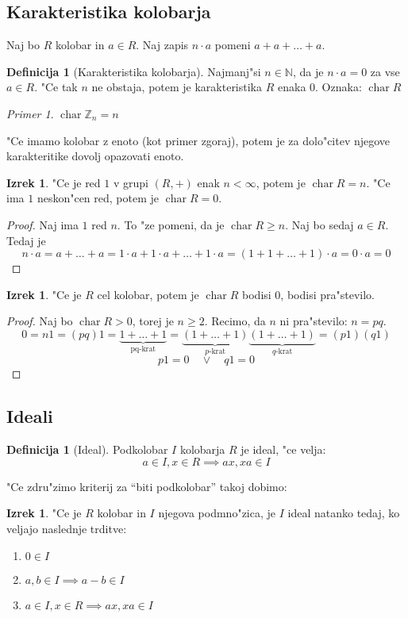 \documentclass[11pt, a4paper]{article}
\theoremstyle{definition}
\newtheorem{defn}[counter]{Definicija}
\newtheorem{theorem}[counter]{Izrek}
\theoremstyle{remark}
\newtheorem*{ex}{Primer}
\newcommand{\N}{\mathbb{N}}
\newcommand{\Z}{\mathbb{Z}}
\newcommand{\ch}{\operatorname{char}}
\begin{document}
	\subsection{Karakteristika kolobarja}
	Naj bo $R$ kolobar in $a \in R$. Naj zapis $n \cdot a$ pomeni $a + a + \ldots + a$.
	\begin{defn}[Karakteristika kolobarja]
		Najmanj"si $n \in \N$, da je $n \cdot a = 0$ za vse $a \in R$. "Ce tak $n$ ne obstaja, potem je karakteristika $R$ enaka $0$.
		Oznaka: $ \ch R$
	\end{defn}

	\begin{ex}
		$ \ch \Z_n = n$
	\end{ex}
	"Ce imamo kolobar z enoto (kot primer zgoraj), potem je za dolo"citev njegove karakteritike dovolj opazovati enoto.
	
	\begin{theorem}
		"Ce je red $1$ v grupi $(R, +)$ enak $n < \infty$, potem je $\ch R = n$. "Ce ima $1$ neskon"cen red, potem je $\ch R = 0$.
	\end{theorem}
	\begin{proof}
		Naj ima $1$ red $n$. To "ze pomeni, da je $\ch R \geq n$.
		Naj bo sedaj $a \in R$. Tedaj je 
		\[ n \cdot a = a + \ldots + a = 1 \cdot a + 1 \cdot a + \ldots + 1 \cdot a = (1 + 1 + \ldots + 1)\cdot a = 0 \cdot a = 0 \]
	\end{proof}

	\begin{theorem}
		"Ce je $R$ cel kolobar, potem je $\ch R$ bodisi $0$, bodisi pra"stevilo.
	\end{theorem}
	\begin{proof}
		Naj bo $\ch R > 0$, torej je $n \geq 2$. Recimo, da $n$ ni pra"stevilo: $n = pq$.
		\[ 0 = n1 = (pq)1 = \underbrace{1 + \ldots + 1}_{\text{pq-krat}} = \underbrace{(1 + \ldots + 1)}_{p\text{-krat}}\underbrace{(1 + \ldots + 1)}_{q\text{-krat}} = (p1)(q1) \]
		\[ p1 = 0 \quad \lor \quad q1 = 0 \]
	\end{proof}

	\subsection{Ideali}
	\begin{defn}[Ideal]
		Podkolobar $I$ kolobarja $R$ je ideal, "ce velja:
		\[ a \in I, x \in R \implies ax, xa \in I \]
	\end{defn}
	"Ce zdru"zimo kriterij za ``biti podkolobar'' takoj dobimo:
	\begin{theorem}
		"Ce je $R$ kolobar in $I$ njegova podmno"zica, je $I$ ideal natanko tedaj, ko veljajo naslednje trditve:
		\begin{enumerate}
			\item $0 \in I$
			\item $a,b \in I \implies a-b \in I$
			\item $a \in I, x \in R \implies ax, xa \in I$
		\end{enumerate}
	\end{theorem}
	
\end{document}
